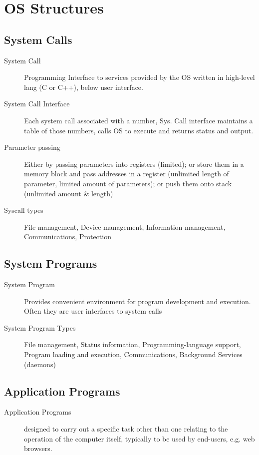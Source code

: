 \section*{OS Structures}

\subsection*{System Calls}
\begin{description}
    \item[System Call] Programming Interface to services provided by the OS written in high-level lang (C or C++), below user interface.
   \item[System Call Interface] Each system call associated with a number, Sys. Call interface maintains a table of those numbers, calls OS to execute and returns status and output.
   \item[Parameter passing] Either by passing parameters into registers (limited); or store them in a memory block and pass addresses in a register (unlimited length of parameter, limited amount of parameters); or push them onto stack (unlimited amount \& length)
  \item[Syscall types] File management, Device management, Information management, Communications, Protection

\end{description}

\subsection*{System Programs}
\begin{description}
  \item[System Program]Provides convenient environment for program development and execution. Often they are user interfaces to system calls 
  \item[System Program Types] File management, Status information, Programming-language support, Program loading and execution, Communications, Background Services (daemons)
\end{description}

\subsection*{Application Programs}
\begin{description}
  \item[Application Programs]  designed to carry out a specific task other than one relating to the operation of the computer itself, typically to be used by end-users, e.g. web browsers.
\end{description}


